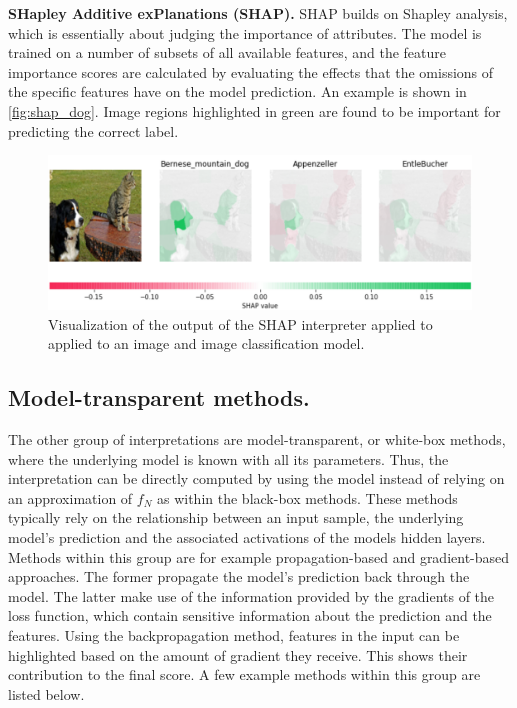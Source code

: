 \documentclass[sigconf]{acmart}
\newcommand{\mypar}[1]{\vspace{0.2cm}\noindent\textbf{#1}}
\begin{document}
\mypar{SHapley Additive exPlanations (SHAP).} SHAP \cite{lundberg2017unified} builds on Shapley analysis, which is essentially about judging the importance of attributes. The model is trained on a number of subsets of all available features, and the feature importance scores are calculated by evaluating the effects that the omissions of the specific features have on the model prediction. An example is shown in \autoref{fig:shap_dog}. Image regions highlighted in green are found to be important for predicting the correct label.

\begin{figure}[ht]
  \centering
  \includegraphics[width=\linewidth]{figures/cat_dog_shap.png}
  \caption{Visualization of the output of the SHAP interpreter applied to applied to an image and image classification model.}\label{fig:shap_dog}
  \vspace{-0.3cm}
\end{figure}

\subsection{Model-transparent methods.}
\label{subsec:wb_methods}

The other group of interpretations are model-transparent, or white-box methods, where the underlying model is known with all its parameters. Thus, the interpretation can be directly computed by using the model instead of relying on an approximation of $f_N$ as within the black-box methods. These methods typically rely on the relationship between an input sample, the underlying model's prediction and the associated activations of the models hidden layers. Methods within this group are for example propagation-based and gradient-based approaches. The former propagate the model's prediction back through the model. The latter make use of the information provided by the gradients of the loss function, which contain sensitive information about the prediction and the features. Using the backpropagation method, features in the input can be highlighted based on the amount of gradient they receive. This shows their contribution to the final score. 
A few example methods within this group are listed below. 
\end{document}
